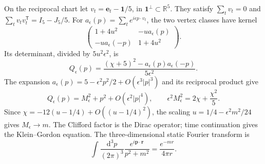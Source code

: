 \documentclass[aps,prx,reprint,longbibliography]{revtex4-2}
\providecommand{\dd}{\mathrm d}
\providecommand{\R}{\mathbb R}
\begin{document}
On the reciprocal chart let $v_t=\mathbf e_t-\mathbf1/5$, in $\mathbf1^\perp\subset\R^5$. They satisfy $\sum_tv_t=0$ and $\sum_tv_tv_t^{\mathsf T}=I_5-J_5/5$. For $a_\epsilon(p)=\sum_te^{i\epsilon p\cdot v_t}$, the two vertex classes have kernel
\begin{equation}
 \begin{pmatrix}1+4u^2&-u a_\epsilon(p)\\
 -u a_\epsilon(-p)&1+4u^2\end{pmatrix}.
 \label{ap:bipartite}
\end{equation}
Its determinant, divided by $5u^2\epsilon^2$, is
\begin{equation}
 Q_\epsilon(p)=\frac{(\chi+5)^2-a_\epsilon(p)a_\epsilon(-p)}{5\epsilon^2}.
 \label{ap:spatialkernel}
\end{equation}
The expansion $a_\epsilon(p)=5-\epsilon^2p^2/2+O(\epsilon^3|p|^3)$ and its reciprocal product give
\begin{equation}
 Q_\epsilon(p)=M_\epsilon^2+p^2+O(\epsilon^2|p|^4),\qquad
 \epsilon^2M_\epsilon^2=2\chi+\frac{\chi^2}{5}.
 \label{ap:continuumlimit}
\end{equation}
Since $\chi=-12(u-1/4)+O((u-1/4)^2)$, the scaling $u=1/4-\epsilon^2m^2/24$ gives $M_\epsilon\to m$. The Clifford factor is the Dirac operator; time continuation gives the Klein--Gordon equation. The three-dimensional static Fourier transform is
\begin{equation}
 \int\frac{\dd^3p}{(2\pi)^3}\frac{e^{i\bm p\cdot\bm r}}{p^2+m^2}
 =\frac{e^{-mr}}{4\pi r}.
 \label{ap:staticgreen}
\end{equation}
\end{document}
